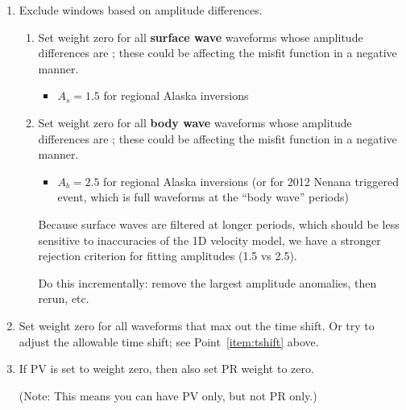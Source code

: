 \begin{enumerate}
\begin{enumerate}
\item Exclude windows based on amplitude differences.
%
\begin{enumerate}
\item Set weight zero for all {\bf surface wave} waveforms whose amplitude differences are ; these could be affecting the misfit function in a negative manner.
\begin{itemize}
\item $A_s = 1.5$ for regional Alaska inversions
\end{itemize}

\item Set weight zero for all {\bf body wave} waveforms whose amplitude differences are ; these could be affecting the misfit function in a negative manner.
\begin{itemize}
\item $A_b = 2.5$ for regional Alaska inversions (or for 2012 Nenana triggered event, which is full waveforms at the ``body wave'' periods)

\end{itemize}

Because surface waves are filtered at longer periods, which should be less sensitive to inaccuracies of the 1D velocity model, we have a stronger rejection criterion for fitting amplitudes (1.5 vs 2.5).

Do this incrementally: remove the largest amplitude anomalies, then rerun, etc.

\end{enumerate}

\item Set weight zero for all waveforms that max out the time shift. Or try to adjust the allowable time shift; see Point~\ref{item:tshift} above.


\item If PV is set to weight zero, then also set PR weight to zero.

(Note: This means you can have PV only, but not PR only.)



\end{enumerate}
\end{enumerate}
